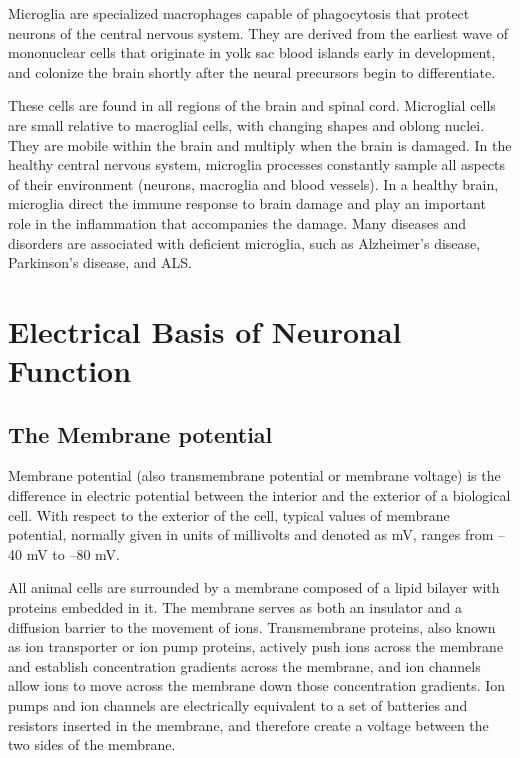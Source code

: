\documentclass[]{book}
\begin{document}
Microglia are specialized macrophages capable of phagocytosis that protect neurons of the central nervous system. They are derived from the earliest wave of mononuclear cells that originate in yolk sac blood islands early in development, and colonize the brain shortly after the neural precursors begin to differentiate.

These cells are found in all regions of the brain and spinal cord. Microglial cells are small relative to macroglial cells, with changing shapes and oblong nuclei. They are mobile within the brain and multiply when the brain is damaged. In the healthy central nervous system, microglia processes constantly sample all aspects of their environment (neurons, macroglia and blood vessels). In a healthy brain, microglia direct the immune response to brain damage and play an important role in the inflammation that accompanies the damage. Many diseases and disorders are associated with deficient microglia, such as Alzheimer's disease, Parkinson's disease, and ALS.

\hypertarget{electrical-basis-of-neuronal-function}{%
\chapter{Electrical Basis of Neuronal Function}\label{electrical-basis-of-neuronal-function}}

\hypertarget{the-membrane-potential}{%
\section{The Membrane potential}\label{the-membrane-potential}}

Membrane potential (also transmembrane potential or membrane voltage) is the difference in electric potential between the interior and the exterior of a biological cell. With respect to the exterior of the cell, typical values of membrane potential, normally given in units of millivolts and denoted as mV, ranges from --40 mV to --80 mV.

All animal cells are surrounded by a membrane composed of a lipid bilayer with proteins embedded in it. The membrane serves as both an insulator and a diffusion barrier to the movement of ions. Transmembrane proteins, also known as ion transporter or ion pump proteins, actively push ions across the membrane and establish concentration gradients across the membrane, and ion channels allow ions to move across the membrane down those concentration gradients. Ion pumps and ion channels are electrically equivalent to a set of batteries and resistors inserted in the membrane, and therefore create a voltage between the two sides of the membrane.
\end{document}
